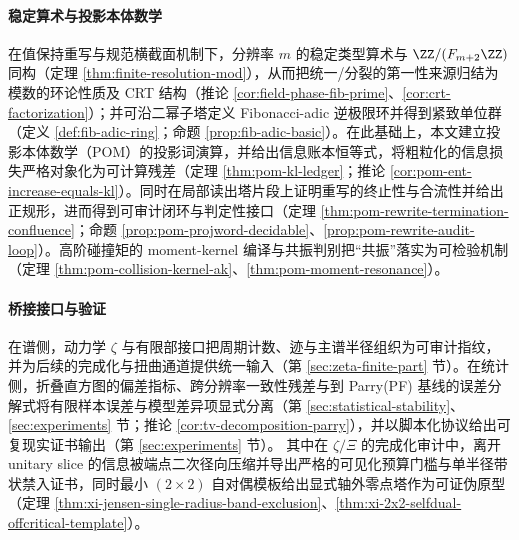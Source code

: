 \paragraph{稳定算术与投影本体数学}
在值保持重写与规范横截面机制下，分辨率 \(m\) 的稳定类型算术与 \(\ZZ/(F_{m+2}\ZZ)\) 同构（定理 \ref{thm:finite-resolution-mod}），从而把统一/分裂的第一性来源归结为模数的环论性质及 CRT 结构（推论 \ref{cor:field-phase-fib-prime}、\ref{cor:crt-factorization}）；并可沿二幂子塔定义 Fibonacci-adic 逆极限环并得到紧致单位群（定义 \ref{def:fib-adic-ring}；命题 \ref{prop:fib-adic-basic}）。在此基础上，本文建立投影本体数学（POM）的投影词演算，并给出信息账本恒等式，将粗粒化的信息损失严格对象化为可计算残差（定理 \ref{thm:pom-kl-ledger}；推论 \ref{cor:pom-ent-increase-equals-kl}）。同时在局部读出塔片段上证明重写的终止性与合流性并给出正规形，进而得到可审计闭环与判定性接口（定理 \ref{thm:pom-rewrite-termination-confluence}；命题 \ref{prop:pom-projword-decidable}、\ref{prop:pom-rewrite-audit-loop}）。高阶碰撞矩的 moment-kernel 编译与共振判别把“共振”落实为可检验机制（定理 \ref{thm:pom-collision-kernel-ak}、\ref{thm:pom-moment-resonance}）。

\paragraph{桥接接口与验证}
在谱侧，动力学 \(\zeta\) 与有限部接口把周期计数、迹与主谱半径组织为可审计指纹，并为后续的完成化与扭曲通道提供统一输入（第 \ref{sec:zeta-finite-part} 节）。在统计侧，折叠直方图的偏差指标、跨分辨率一致性残差与到 Parry(PF) 基线的误差分解式将有限样本误差与模型差异项显式分离（第 \ref{sec:statistical-stability}、\ref{sec:experiments} 节；推论 \ref{cor:tv-decomposition-parry}），并以脚本化协议给出可复现实证书输出（第 \ref{sec:experiments} 节）。
其中在 \(\zeta/\Xi\) 的完成化审计中，离开 unitary slice 的信息被端点二次径向压缩并导出严格的可见化预算门槛与单半径带状禁入证书，同时最小 \((2\times2)\) 自对偶模板给出显式轴外零点塔作为可证伪原型（定理 \ref{thm:xi-jensen-single-radius-band-exclusion}、\ref{thm:xi-2x2-selfdual-offcritical-template}）。

